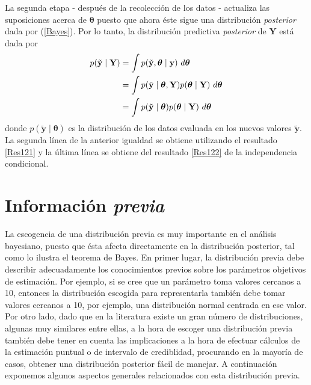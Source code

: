 \documentclass[
  spanish,
  letter]{book}
\theoremstyle{definition}
\theoremstyle{definition}
\theoremstyle{definition}
\theoremstyle{remark}
\begin{document}
La segunda etapa - después de la recolección de los datos - actualiza las suposiciones acerca de \(\boldsymbol \theta\) puesto que ahora éste sigue una distribución \emph{posterior} dada por (\ref{Bayes}). Por lo tanto, la distribución predictiva \emph{posterior} de \(\mathbf{Y}\) está dada por
\begin{align}\label{predictpos}
p(\tilde{\mathbf{y}} \mid \mathbf{Y})&=\int p(\tilde{\mathbf{y}},\boldsymbol \theta\mid \mathbf{y})\ d\boldsymbol \theta\notag \\
&=\int p(\tilde{\mathbf{y}} \mid \boldsymbol \theta,\mathbf{Y})p(\boldsymbol \theta\mid \mathbf{Y})\ d\boldsymbol \theta\notag \\
&=\int p(\tilde{\mathbf{y}} \mid \boldsymbol \theta)p(\boldsymbol \theta\mid \mathbf{Y})\ d\boldsymbol \theta
\end{align}
donde \(p(\tilde{\mathbf{y}} \mid \boldsymbol \theta)\) es la distribución de los datos evaluada en los nuevos valores \(\tilde{\mathbf{y}}\). La segunda línea de la anterior igualdad se obtiene utilizando el resultado \ref{Res121} y la última línea se obtiene del resultado \ref{Res122} de la independencia condicional.

\hypertarget{informaciuxf3n}{%
\section{\texorpdfstring{Información \emph{previa}}{Información }}\label{informaciuxf3n}}

La escogencia de una distribución previa es muy importante en el análisis bayesiano, puesto que ésta afecta directamente en la distribución posterior, tal como lo ilustra el teorema de Bayes. En primer lugar, la distribución previa debe describir adecuadamente los conocimientos previos sobre los parámetros objetivos de estimación. Por ejemplo, si se cree que un parámetro toma valores cercanos a 10, entonces la distribución escogida para representarla también debe tomar valores cercanos a 10, por ejemplo, una distribución normal centrada en ese valor. Por otro lado, dado que en la literatura existe un gran número de distribuciones, algunas muy similares entre ellas, a la hora de escoger una distribución previa también debe tener en cuenta las implicaciones a la hora de efectuar cálculos de la estimación puntual o de intervalo de crediblidad, procurando en la mayoría de casos, obtener una distribución posterior fácil de manejar. A continuación exponemos algunos aspectos generales relacionados con esta distribución previa.
\end{document}
